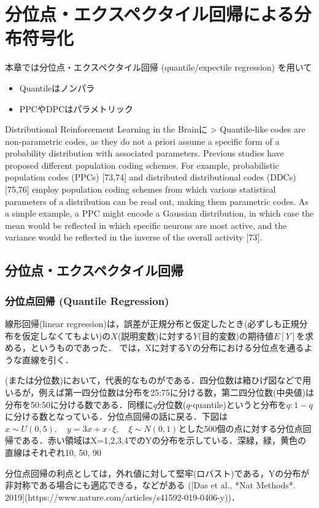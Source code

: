 \section{分位点・エクスペクタイル回帰による分布符号化}
本章では分位点・エクスペクタイル回帰 (quantile/expectile regression) を用いて

\begin{itemize}
\item Quantileはノンパラ
\item PPCやDPCはパラメトリック
\end{itemize}

Distributional Reinforcement Learning in the Brainに
> Quantile-like codes are non-parametric codes, as they do not a priori assume a specific form of a probability distribution with associated parameters. Previous studies have proposed different population coding schemes. For example, probabilistic population codes (PPCs) [73,74] and distributed distributional codes (DDCs) [75,76] employ population coding schemes from which various statistical parameters of a distribution can be read out, making them parametric codes. As a simple example, a PPC might encode a Gaussian distribution, in which case the mean would be reflected in which specific neurons are most active, and the variance would be reflected in the inverse of the overall activity [73].
\subsection{分位点・エクスペクタイル回帰}
\subsubsection{分位点回帰 (Quantile Regression)}
線形回帰(linear regression)は，誤差が正規分布と仮定したとき(必ずしも正規分布を仮定しなくてもよい)の$X$(説明変数)に対する$Y$(目的変数)の期待値$E[Y]$を求める，というものであった．\textbf{} では，Xに対するYの分布における分位点を通るような直線を引く．

\textbf{}(または分位数)において，代表的なものが\textbf{}である．四分位数は箱ひげ図などで用いるが，例えば第一四分位数は分布を25:75に分ける数，第二四分位数(中央値)は分布を50:50に分ける数である．同様に$q$分位数($q$-quantile)というと分布を$q:1-q$に分ける数となっている．分位点回帰の話に戻る．下図は$x\sim U(0, 5),\quad y=3x+x\cdot \xi,\quad \xi\sim N(0,1)$とした500個の点に対する分位点回帰である．赤い領域はX=1,2,3,4でのYの分布を示している．深緑，緑，黄色の直線はそれぞれ10, 50, 90%



分位点回帰の利点としては，外れ値に対して堅牢(ロバスト)である，Yの分布が非対称である場合にも適応できる，などがある ([Das et al., *Nat Methods*. 2019](https://www.nature.com/articles/s41592-019-0406-y))．
